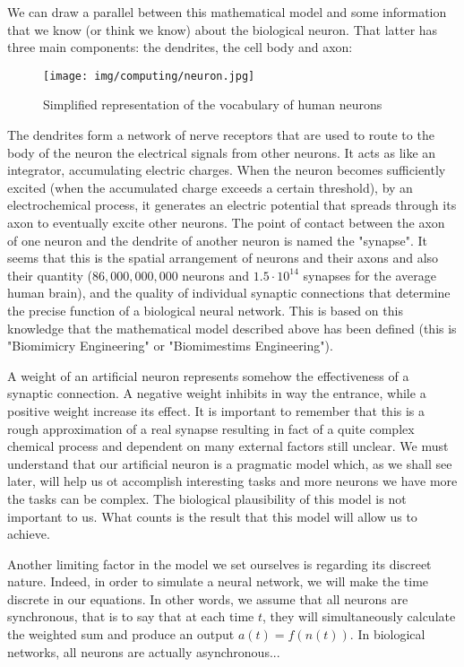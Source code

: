 	We can draw a parallel between this mathematical model and some information that we know (or think we know) about the biological neuron. That latter has three main components: the dendrites, the cell body and axon:	
	\begin{figure}[H]
		\centering
		\texttt{[image: img/computing/neuron.jpg]}
		\caption{Simplified representation of the vocabulary of human neurons}
	\end{figure}
	The dendrites form a network of nerve receptors that are used to route to the body of the neuron the electrical signals from other neurons. It acts as like an integrator, accumulating electric charges. When the neuron becomes sufficiently excited (when the accumulated charge exceeds a certain threshold), by an electrochemical process, it generates an electric potential that spreads through its axon to eventually excite other neurons. The point of contact between the axon of one neuron and the dendrite of another neuron is named the "synapse". It seems that this is the spatial arrangement of neurons and their axons and also their quantity ($86,000,000,000$ neurons and $1.5\cdot 10^{14}$ synapses for the average human brain), and the quality of individual synaptic connections that determine the precise function of a biological neural network. This is based on this knowledge that the mathematical model described above has been defined (this is "Biomimicry Engineering" or "Biomimestims Engineering").
	
	A weight of an artificial neuron represents somehow the effectiveness of a synaptic connection. A negative weight inhibits in way the entrance, while a positive weight increase its effect. It is important to remember that this is a rough approximation of a real synapse resulting in fact of a quite complex chemical process and dependent on many external factors still unclear. We must understand that our artificial neuron is a pragmatic model which, as we shall see later, will help us ot accomplish interesting tasks and more neurons we have more the tasks can be complex. The biological plausibility of this model is not important to us. What counts is the result that this model will allow us to achieve.
	
	Another limiting factor in the model we set ourselves is regarding its discreet nature. Indeed, in order to simulate a neural network, we will make the time discrete in our equations. In other words, we assume that all neurons are synchronous, that is to say that at each time $t$, they will simultaneously calculate the weighted sum and produce an output $a(t)=f(n(t))$. In biological networks, all neurons are actually asynchronous...


